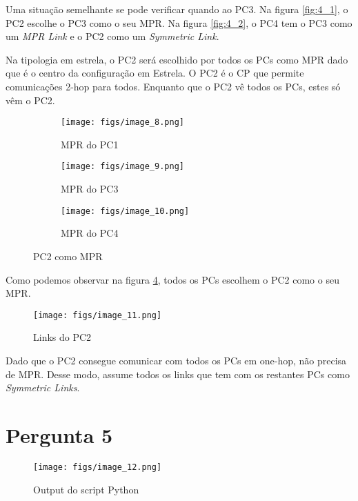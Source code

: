 Uma situação semelhante se pode verificar quando ao PC3.
Na figura \ref{fig:4_1}, o PC2 escolhe o PC3 como o seu MPR.
Na figura \ref{fig:4_2}, o PC4 tem o PC3 como um \textit{MPR Link} e o PC2 como um \textit{Symmetric Link}.


Na tipologia em estrela, o PC2 será escolhido por todos os PCs como MPR dado que é o centro da configuração em Estrela.
O PC2 é o CP que permite comunicações 2-hop para todos.
Enquanto que o PC2 vê todos os PCs, estes só vêm o PC2.

\begin{figure}[H]
    \centering
    \begin{subfigure}{.33\textwidth}
        \centering
        \texttt{[image: figs/image\_8.png]}
        \caption{MPR do PC1}
        \label{fig:6_1}
    \end{subfigure}%
    \begin{subfigure}{.33\textwidth}
        \centering
        \texttt{[image: figs/image\_9.png]}
        \caption{MPR do PC3}
        \label{fig:6_2}
    \end{subfigure}
    \begin{subfigure}{.33\textwidth}
        \centering
        \texttt{[image: figs/image\_10.png]}
        \caption{MPR do PC4}
        \label{fig:6_}
    \end{subfigure}
    \caption{PC2 como MPR}
    \label{fig:6}
\end{figure}

Como podemos observar na figura \ref{fig:6}, todos os PCs escolhem o PC2 como o seu MPR.

\begin{figure}[H]
    \centering
    \texttt{[image: figs/image\_11.png]}
    \caption{Links do PC2}
    \label{fig:7}
\end{figure}

Dado que o PC2 consegue comunicar com todos os PCs em one-hop, não precisa de MPR.
Desse modo, assume todos os links que tem com os restantes PCs como \textit{Symmetric Links}.


\section{Pergunta 5} \label{ex5}

\begin{figure}[H]
    \centering
    \texttt{[image: figs/image\_12.png]}
    \caption{Output do script Python}
    \label{fig:8}
\end{figure}


